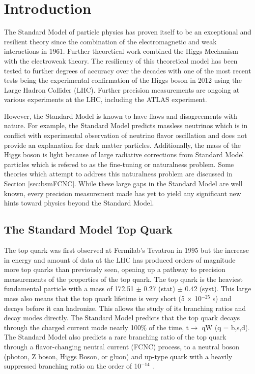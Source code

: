 \chapter{Introduction}
\label{ch:Introduction}



The Standard Model of particle physics has proven itself to be an exceptional and resilient theory since the combination of the electromagnetic and weak interactions in 1961\cite{SM1Glashow}.  Further theoretical work combined the Higgs Mechanism\cite{Higgs1,Higgs2} with the electroweak theory\cite{SM2Weinberg, SM3Salam}.  The resiliency of this theoretical model has been tested to further degrees of accuracy over the decades with one of the most recent tests being the experimental confirmation of the Higgs boson in 2012\cite{Higgs3,Higgs4} using the Large Hadron Collider (LHC).  Further precision measurements are ongoing at various experiments at the LHC, including the ATLAS experiment.

However, the Standard Model is known to have flaws and disagreements with nature.  For example, the Standard Model predicts massless neutrinos which is in conflict with experimental observation of neutrino flavor oscillation and does not provide an explanation for dark matter particles. Additionally, the mass of the Higgs boson is light because of large radiative corrections from Standard Model particles which is refered to as the fine-tuning or naturalness problem.  Some theories which attempt to address this naturalness problem are discussed in Section \ref{sec:bsmFCNC}.  While these large gaps in the Standard Model are well known, every precision measurement made has yet to yield any significant new hints toward physics beyond the Standard Model.  

\section{The Standard Model Top Quark}
The top quark was first observed at Fermilab's Tevatron in 1995\cite{TopObs} but the increase in energy and amount of data at the LHC has produced orders of magnitude more top quarks than previously seen, opening up a pathway to precision measurements of the properties of the top quark.  The top quark is the heaviest fundamental particle with a mass of 172.51 $\pm$ 0.27 (stat) $\pm$ 0.42 (syst)\cite{TopMass2017}.  This large mass also means that the top quark lifetime is very short (5 $\times$ 10$^{-25}$ s) and decays before it can hadronize.  This allows the study of its branching ratios and decay modes directly.  The Standard Model predicts that the top quark decays through the charged current mode nearly 100\% of the time, t$\rightarrow$ qW (q = b,s,d)\cite{PDG2018}.   The Standard Model also predicts a rare branching ratio of the top quark through a flavor-changing neutral current (FCNC) process, to a neutral boson (photon, Z boson, Higgs Boson, or gluon) and up-type quark with a heavily suppressed branching ratio on the order of 10$^{-14}$ \cite{2HDM-2}.

